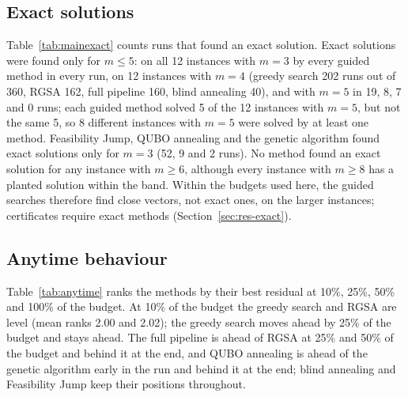 \documentclass[pdflatex,sn-mathphys-num]{sn-jnl}
\theoremstyle{thmstyleone}
\theoremstyle{thmstylethree}
\begin{document}
\subsection{Exact solutions}
Table~\ref{tab:mainexact} counts runs that found an exact solution. Exact solutions were found only for $m\le5$: on all 12 instances with $m=3$ by every guided method in every run, on 12 instances with $m=4$ (greedy search 202 runs out of 360, RGSA 162, full pipeline 160, blind annealing 40), and with $m=5$ in 19, 8, 7 and 0 runs; each guided method solved 5 of the 12 instances with $m=5$, but not the same 5, so 8 different instances with $m=5$ were solved by at least one method. Feasibility Jump, QUBO annealing and the genetic algorithm found exact solutions only for $m=3$ (52, 9 and 2 runs). No method found an exact solution for any instance with $m\ge6$, although every instance with $m\ge8$ has a planted solution within the band. Within the budgets used here, the guided searches therefore find close vectors, not exact ones, on the larger instances; certificates require exact methods (Section~\ref{sec:res-exact}).



\subsection{Anytime behaviour}
Table~\ref{tab:anytime} ranks the methods by their best residual at 10\%, 25\%, 50\% and 100\% of the budget. At 10\% of the budget the greedy search and RGSA are level (mean ranks 2.00 and 2.02); the greedy search moves ahead by 25\% of the budget and stays ahead. The full pipeline is ahead of RGSA at 25\% and 50\% of the budget and behind it at the end, and QUBO annealing is ahead of the genetic algorithm early in the run and behind it at the end; blind annealing and Feasibility Jump keep their positions throughout.


\end{document}
